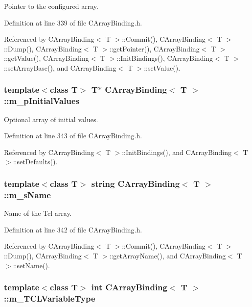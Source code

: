 Pointer to the configured array.



Definition at line 339 of file CArray\-Binding.h.

Referenced by CArray\-Binding$<$ T $>$::Commit(), CArray\-Binding$<$ T $>$::Dump(), CArray\-Binding$<$ T $>$::get\-Pointer(), CArray\-Binding$<$ T $>$::get\-Value(), CArray\-Binding$<$ T $>$::Init\-Bindings(), CArray\-Binding$<$ T $>$::set\-Array\-Base(), and CArray\-Binding$<$ T $>$::set\-Value().
\subsubsection{\setlength{\rightskip}{0pt plus 5cm}template$<$class T$>$ T$\ast$ CArray\-Binding$<$ T $>$::m\_\-p\-Initial\-Values\hspace{0.3cm}{\tt  [private]}}\label{classCArrayBinding_o4}


Optional array of initial values.



Definition at line 343 of file CArray\-Binding.h.

Referenced by CArray\-Binding$<$ T $>$::Init\-Bindings(), and CArray\-Binding$<$ T $>$::set\-Defaults().
\subsubsection{\setlength{\rightskip}{0pt plus 5cm}template$<$class T$>$ string CArray\-Binding$<$ T $>$::m\_\-s\-Name\hspace{0.3cm}{\tt  [private]}}\label{classCArrayBinding_o3}


Name of the Tcl array.



Definition at line 342 of file CArray\-Binding.h.

Referenced by CArray\-Binding$<$ T $>$::Commit(), CArray\-Binding$<$ T $>$::Dump(), CArray\-Binding$<$ T $>$::get\-Array\-Name(), and CArray\-Binding$<$ T $>$::set\-Name().
\subsubsection{\setlength{\rightskip}{0pt plus 5cm}template$<$class T$>$ int CArray\-Binding$<$ T $>$::m\_\-TCLVariable\-Type\hspace{0.3cm}{\tt  [private]}}\label{classCArrayBinding_o5}


